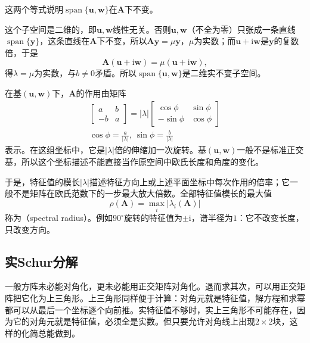 这两个等式说明$\operatorname{span}\{\bm u,\bm w\}$在$\bm A$下不变。

这个子空间是二维的，即$\bm u,\bm w$线性无关。否则$\bm u,\bm w$（不全为零）只张成一条直线$\operatorname{span}\{\bm y\}$，这条直线在$\bm A$下不变，所以$\bm A\bm y=\mu\bm y$，$\mu$为实数；而$\bm u+\mathrm i\bm w$是$\bm y$的复数倍，于是
\[
 \bm A(\bm u+\mathrm i\bm w)=\mu(\bm u+\mathrm i\bm w),
\]
得$\lambda=\mu$为实数，与$b\neq0$矛盾。所以$\operatorname{span}\{\bm u,\bm w\}$是二维实不变子空间。

在基$(\bm u,\bm w)$下，$\bm A$的作用由矩阵
\[
\begin{gathered}
\begin{bmatrix}a&b\\-b&a\end{bmatrix}
 =|\lambda|\begin{bmatrix}\cos\phi&\sin\phi\\-\sin\phi&\cos\phi\end{bmatrix}\\
\cos\phi=\frac{a}{|\lambda|},\ \sin\phi=\frac{b}{|\lambda|}
\end{gathered}
\]
表示。在这组坐标中，它是$|\lambda|$倍的伸缩加一次旋转。基$(\bm u,\bm w)$一般不是标准正交基，所以这个坐标描述不能直接当作原空间中欧氏长度和角度的变化。

于是，特征值的模长$|\lambda|$描述特征方向上或上述平面坐标中每次作用的倍率；它一般不是矩阵在欧氏范数下的一步最大放大倍数。全部特征值模长的最大值
\begin{equation}
 \rho(\bm A)=\max_i|\lambda_i(\bm A)|
 \label{eq:ls-spectral-radius}
\end{equation}
称为（spectral radius）。例如$90^\circ$旋转的特征值为$\pm\mathrm i$，谱半径为$1$：它不改变长度，只改变方向。

\subsection{实Schur分解}

一般方阵未必能对角化，更未必能用正交矩阵对角化。退而求其次，可以用正交矩阵把它化为上三角形。上三角形同样便于计算：对角元就是特征值，解方程和求幂都可以从最后一个坐标逐个向前推。实特征值不够时，实上三角形不可能存在，因为它的对角元就是特征值，必须全是实数。但只要允许对角线上出现$2\times2$块，这样的化简总能做到。

